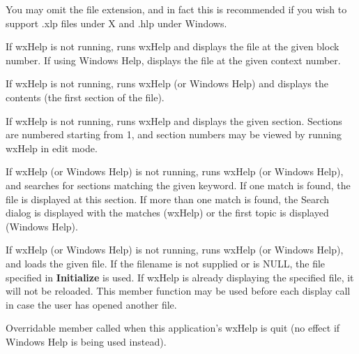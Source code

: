 You may omit the file extension, and in fact this is recommended if you
wish to support .xlp files under X and .hlp under Windows.



If wxHelp is not running, runs wxHelp and displays the file at the given block number.
If using Windows Help, displays the file at the given context number.



If wxHelp is not running, runs wxHelp (or Windows Help) and displays the
contents (the first section of the file).



If wxHelp is not running, runs wxHelp and displays the given section.
Sections are numbered starting from 1, and section numbers may be viewed by running
wxHelp in edit mode.



If wxHelp (or Windows Help) is not running, runs wxHelp (or Windows
Help), and searches for sections matching the given keyword. If one
match is found, the file is displayed at this section. If more than one
match is found, the Search dialog is displayed with the matches (wxHelp)
or the first topic is displayed (Windows Help).



If wxHelp (or Windows Help) is not running, runs wxHelp (or Windows
Help), and loads the given file. If the filename is not supplied or is
NULL, the file specified in {\bf Initialize} is used. If wxHelp is
already displaying the specified file, it will not be reloaded. This
member function may be used before each display call in case the user
has opened another file.



Overridable member called when this application's wxHelp is quit
(no effect if Windows Help is being used instead).

